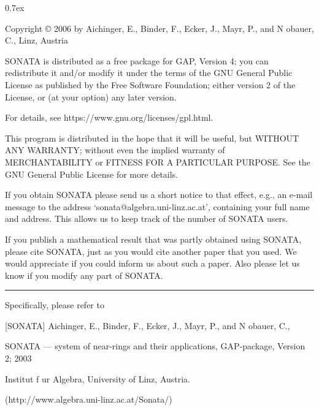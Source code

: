 


\begingroup
\def\"#1{\accent127 #1}
\parindent 0pt
\parskip 0.7ex

{\everypar{\hangindent\manindent}
Copyright {\copyright} 2006 by\hfill\break
Aichinger, E., Binder, F., Ecker, J., Mayr, P., and N{\"o}bauer, C.,\hfill{} Linz, Austria}

\medskip

 SONATA  is  distributed as a free package for GAP, Version 4;
 you can redistribute it and/or
 modify it under the terms of the GNU General Public License
 as published by the Free Software Foundation;
 either version 2 of the License, or (at your option) any later version.

 For details, see https://www.gnu.org/licenses/gpl.html.

 This program is distributed in the hope that it will be useful,
 but WITHOUT ANY WARRANTY; without even the implied warranty of
 MERCHANTABILITY or FITNESS FOR A PARTICULAR PURPOSE.  See the
 GNU General Public License for more details.

 If you obtain SONATA please send us  a short notice to that effect,
 e.g., an  e-mail  message   to  the  address
 `sonata@algebra.uni-linz.ac.at',
 containing your full  name and address. 
 This  allows us to keep track of the number of SONATA users.

 If you  publish  a mathematical  result  that  was  partly obtained using
 SONATA, please cite SONATA, just as you would cite another paper that you
 used.\* We would appreciate if you could inform us  about such a paper.
 Also please let us know if you  modify any part of SONATA.


\vfill\hrule

\noindent\llap{\*\enspace}Specifically, please refer to

\smallskip \parindent4pc \parskip 0pt
\item{[SONATA]}
Aichinger, E., Binder, F., Ecker, J., Mayr, P., and N{\"o}bauer, C.,
\item{} SONATA --- system of near-rings and their applications, GAP-package, Version 2;
2003
\item{} Institut f\"ur Algebra, University of Linz, Austria.
\item{} (http://www.algebra.uni-linz.ac.at/Sonata/)
\endgroup


